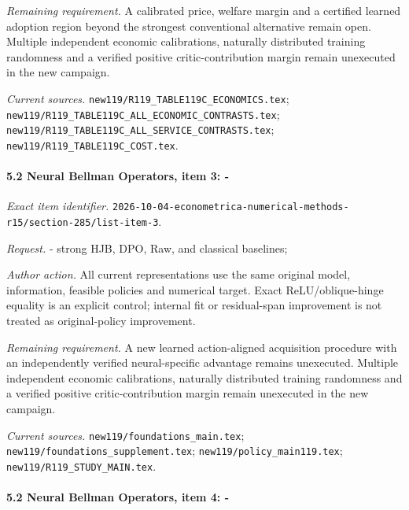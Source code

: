 \par\emph{Remaining requirement.} A calibrated price, welfare margin and a certified learned adoption region beyond the strongest conventional alternative remain open. Multiple independent economic calibrations, naturally distributed training randomness and a verified positive critic-contribution margin remain unexecuted in the new campaign.

\par\emph{Current sources.} \nolinkurl{new119/R119_TABLE119C_ECONOMICS.tex}; \nolinkurl{new119/R119_TABLE119C_ALL_ECONOMIC_CONTRASTS.tex}; \nolinkurl{new119/R119_TABLE119C_ALL_SERVICE_CONTRASTS.tex}; \nolinkurl{new119/R119_TABLE119C_COST.tex}.

\paragraph{5.2 Neural Bellman Operators, item 3: -}

\emph{Exact item identifier.} \nolinkurl{2026-10-04-econometrica-numerical-methods-r15/section-285/list-item-3}.

\par\emph{Request.} - strong HJB, DPO, Raw, and classical baselines;

\par\emph{Author action.} All current representations use the same original model, information, feasible policies and numerical target. Exact ReLU/\allowbreak{}oblique-hinge equality is an explicit control; internal fit or residual-span improvement is not treated as original-policy improvement.

\par\emph{Remaining requirement.} A new learned action-aligned acquisition procedure with an independently verified neural-specific advantage remains unexecuted. Multiple independent economic calibrations, naturally distributed training randomness and a verified positive critic-contribution margin remain unexecuted in the new campaign.

\par\emph{Current sources.} \nolinkurl{new119/foundations_main.tex}; \nolinkurl{new119/foundations_supplement.tex}; \nolinkurl{new119/policy_main119.tex}; \nolinkurl{new119/R119_STUDY_MAIN.tex}.

\paragraph{5.2 Neural Bellman Operators, item 4: -}

